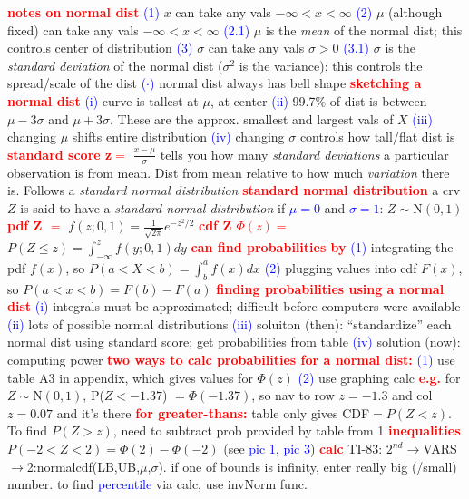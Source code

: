 \documentclass[10pt]{extarticle}
\newcommand{\re}[1]{\textcolor{red}{\textbf{#1}}}
\newcommand{\bt}[1]{\textcolor{blue}{#1}}
\begin{document}
	\re{notes on normal dist}
	\bt{(1)} $x$ can take any vals $-\infty<x<\infty$
	\bt{(2)} $\mu$ (although fixed) can take any vals $-\infty<x<\infty$
	\bt{(2.1)} $\mu$ is the \emph{mean} of the normal dist; this controls center of
	distribution
	\bt{(3)} $\sigma$ can take any vals $\sigma>0$
	\bt{(3.1)} $\sigma$ is the \emph{standard deviation} of the normal dist
	($\sigma^{2}$ is the variance); this controls the spread/scale of the dist
	\bt{($\cdot$)} normal dist always has bell shape
	\re{sketching a normal dist}
	\bt{(i)} curve is tallest at $\mu$, at center
	\bt{(ii)} 99.7$\%$ of dist is between $\mu-3\sigma$ and $\mu+3\sigma$. These are
	the approx. smallest and largest vals of $X$
	\bt{(iii)} changing $\mu$ shifts entire distribution
	\bt{(iv)} changing $\sigma$ controls how tall/flat dist is
	\re{standard score z$=$} $\frac{x-\mu}{\sigma}$ tells you how many \emph{standard
	deviations} a particular observation is from mean. Dist from mean relative to how
	much \emph{variation} there is. Follows a \emph{standard normal distribution}
	\re{standard normal distribution} a crv $Z$ is said to have a \emph{standard
	normal distribution} if \bt{$\mu=0$} and \bt{$\sigma=1$}:
	$Z\mathtt{\sim}$N$(0,1)$
	\re{pdf Z $=$} $f(z;0,1) = \frac{1}{\sqrt{2\pi}}e^{-z^{2}/2}$
	\re{cdf Z $\Phi(z)=$} $P(Z\leq z) = \int_{-\infty}^{z}f(y;0,1)dy$
	\re{can find probabilities by}
	\bt{(1)} integrating the pdf $f(x)$, so $P(a<X<b) = \int_{b}^{a}f(x)dx$
	\bt{(2)} plugging values into cdf $F(x)$, so $P(a<x<b)=F(b)-F(a)$
	\re{finding probabilities using a normal dist}
	\bt{(i)} integrals must be
	approximated; difficult before computers were available
	\bt{(ii)} lots of possible normal distributions
	\bt{(iii)} soluiton (then): ``standardize'' each normal dist using standard score;
	get probabilities from table
	\bt{(iv)} solution (now): computing power
	\re{two ways to calc probabilities for a normal dist:}
	\bt{(1)} use table A3 in appendix, which gives values for $\Phi(z)$
	\bt{(2)} use graphing calc
	\re{e.g.} for $Z\mathtt{\sim}$N$(0,1)$, P($Z < -1.37$) $=\Phi(-1.37)$, so nav to
	row $z=-1.3$ and col $z=0.07$ and it's there
	\re{for greater-thans:} table only gives CDF$=P(Z<z)$. To find $P(Z>z)$, need to
	subtract prob provided by table from 1
	\re{inequalities} $P(-2<Z<2) = \Phi(2) - \Phi(-2)$ (see \bt{pic 1, pic 3})
	\re{calc} TI-83:
	$2^{nd}\rightarrow$VARS$\rightarrow$2:normalcdf(LB,UB,$\mu$,$\sigma$). if one of
	bounds is infinity, enter really big (/small) number. to find \bt{percentile} via
	calc, use invNorm func.
\end{document}
